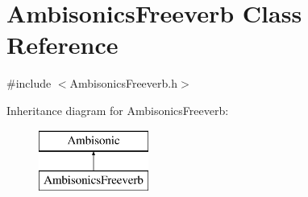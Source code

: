 \hypertarget{class_ambisonics_freeverb}{\section{Ambisonics\-Freeverb Class Reference}
\label{class_ambisonics_freeverb}
}


{\ttfamily \#include $<$Ambisonics\-Freeverb.\-h$>$}

Inheritance diagram for Ambisonics\-Freeverb\-:\begin{figure}[H]
\begin{center}
\leavevmode
\includegraphics[height=2.000000cm]{class_ambisonics_freeverb}
\end{center}
\end{figure}
